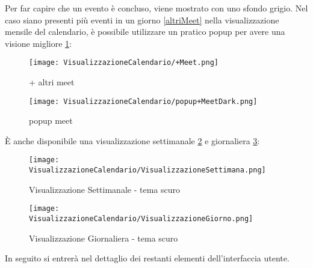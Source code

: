 \noindent Per far capire che un evento è concluso, viene mostrato con uno sfondo grigio.
\noindent  Nel caso siano presenti più eventi in un giorno \ref{altriMeet} nella visualizzazione mensile 
del calendario, è possibile utilizzare un pratico popup per avere una visione migliore \ref{popupAltriMeet}:
\begin{figure}[H]
    \centering
    \begin{minipage}{0.45\textwidth}
        \centering
        \texttt{[image: VisualizzazioneCalendario/+Meet.png]}
        \caption{+ altri meet}
        \label{altriMeet}
    \end{minipage}
    \hspace{0.05\textwidth}
    \begin{minipage}{0.45\textwidth}
        \centering
        \texttt{[image: VisualizzazioneCalendario/popup+MeetDark.png]}
        \caption{popup meet}
        \label{popupAltriMeet}
    \end{minipage}
\end{figure}
\clearpage
\noindent È anche disponibile una visualizzazione settimanale \ref{visualizzazioneSettimanale} 
e giornaliera \ref{visualizzazioneGiornaliera}:
\begin{figure}[H]
    \centering
    \texttt{[image: VisualizzazioneCalendario/VisualizzazioneSettimana.png]}
    \caption{Visualizzazione Settimanale - tema scuro}
    \label{visualizzazioneSettimanale}
\end{figure}
\begin{figure}[H]
    \centering
    \texttt{[image: VisualizzazioneCalendario/VisualizzazioneGiorno.png]}
    \caption{Visualizzazione Giornaliera - tema scuro}
    \label{visualizzazioneGiornaliera}
\end{figure}
\noindent In seguito si entrerà nel dettaglio dei restanti elementi dell'interfaccia utente.